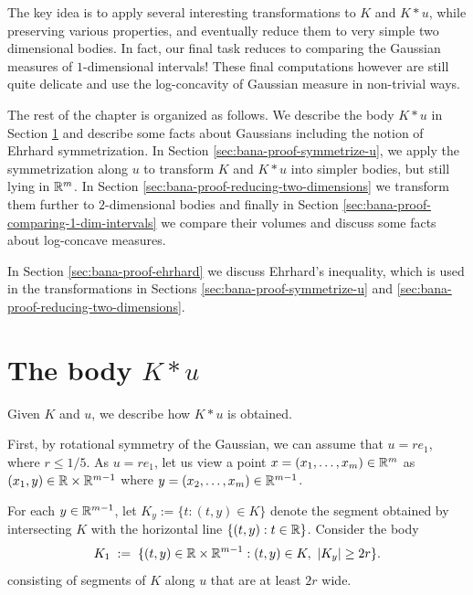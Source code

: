 The key idea is to apply several interesting transformations to $K$ and $K*u$, while preserving various properties, and eventually reduce them to very simple two dimensional bodies. In fact, our final task reduces to comparing the Gaussian measures of  $1$-dimensional intervals! 
These final computations however are still quite delicate and use the log-concavity of Gaussian measure in non-trivial ways.


\medskip
{}
The rest of the chapter is organized as follows. We describe the body $K*u$ in Section \ref{sec:bana-proof-body} and describe some facts about Gaussians including the notion of Ehrhard symmetrization. In Section \ref{sec:bana-proof-symmetrize-u}, we apply the symmetrization along $u$ to transform $K$ and $K*u$ into simpler bodies, but still lying in $\mathbb{R}^m$. In Section \ref{sec:bana-proof-reducing-two-dimensions} we transform them further to $2$-dimensional bodies and finally in Section \ref{sec:bana-proof-comparing-1-dim-intervals} we compare their volumes and discuss some facts about log-concave measures.

In Section \ref{sec:bana-proof-ehrhard} we discuss Ehrhard's inequality, which is used in the transformations in Sections \ref{sec:bana-proof-symmetrize-u} and \ref{sec:bana-proof-reducing-two-dimensions}.

\section{The body $K*u$} 
\label{sec:bana-proof-body}
Given $K$ and $u$, we describe how $K*u$ is obtained.

First, by rotational symmetry of the Gaussian, we can assume that $u=r e_1$, where $r\leq 1/5$. 
As $u=re_1$, let us view a point $x =(x_1,\ldots,x_m) \in \mathbb{R}^m$ as $(x_1,y) \in \mathbb{R} \times \mathbb{R}^{m-1}$ where $y=(x_2,\ldots,x_{m}) \in \mathbb{R}^{m-1}$. 

For each $y \in \mathbb{R}^{m-1}$, let   $K_y := \{t: (t,y)\in K\}$ denote the segment obtained by intersecting $K$ with the horizontal line $\{(t,y): t \in \mathbb{R}\}$.
Consider the body 
\[K_1 \;:=\; \{(t,y)\in\mathbb{R}\times\mathbb{R}^{m-1} : (t,y)\in K,\ |K_y|\ge 2r\}.\]
 consisting of segments of $K$ along $u$ that are at least $2r$ wide.

